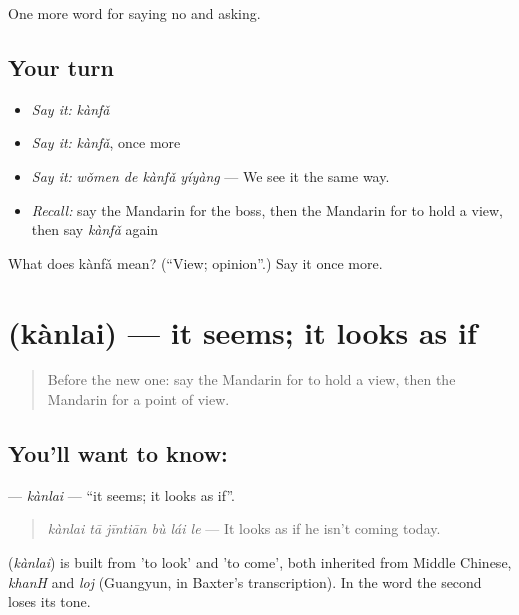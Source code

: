 \begin{grammarlens}[title={What you've built}]
One more word for saying no and asking.
\end{grammarlens}

\subsection*{Your turn}
\begin{itemize}
\raggedright
  \item \emph{Say it:} \emph{kànfǎ}
  \item \emph{Say it:} \emph{kànfǎ}, once more
  \item \emph{Say it:} \emph{wǒmen de kànfǎ yíyàng} — We see it the same way.
  \item \emph{Recall:} say the Mandarin for the boss, then the Mandarin for to hold a view, then say \emph{kànfǎ} again
\end{itemize}

\begin{tcolorbox}[breakable,colback=teal!4,colframe=teal!35!black,title={Before you move on}]
What does kànfǎ mean? (\textquotedblleft{}View; opinion\textquotedblright{}.) Say it once more.
\end{tcolorbox}
\section[\texorpdfstring{\zh{看来} (kànlai)}{看来 (kànlai)}]{ (kànlai) — it seems; it looks as if}

\label{lesson:ZH-C256-kanlai}



\begin{quote}
Before the new one: say the Mandarin for to hold a view, then the Mandarin for a point of view.
\end{quote}

\subsection*{You'll want to know: }
\textbf{} — \emph{kànlai} — \textquotedblleft{}it seems; it looks as if\textquotedblright{}.

\begin{quote}
\textbf{} \emph{kànlai tā jīntiān bù lái le} — It looks as if he isn't coming today.
\end{quote}

\begin{cousinweb}
\textbf{} (\emph{kànlai}) is built from  'to look' and  'to come', both inherited from Middle Chinese, \emph{khanH} and \emph{loj} (Guangyun, in Baxter's transcription). In the word the second loses its tone.
\end{cousinweb}

